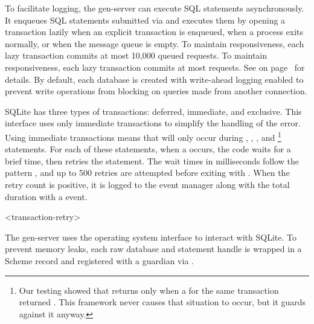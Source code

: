 To facilitate logging, the  gen-server can execute SQL statements
asynchronously. It enqueues SQL statements submitted via  and
executes them by opening a transaction lazily when an explicit transaction is
enqueued, when a  process exits normally, or when the 
message queue is empty.
To maintain responsiveness, each lazy transaction commits at most 10,000 queued  requests.
To maintain responsiveness, each lazy transaction commits at most   requests.
See  on page~\pageref{db:options} for details.
By default, each database is created with write-ahead logging enabled
to prevent write operations from blocking on queries made from another
connection.

SQLite has three types of transactions: deferred, immediate, and
exclusive. This interface uses only immediate transactions to simplify
the handling of the  error.  Using immediate
transactions means that  will only occur during
, , ,
and \footnote{Our testing showed that
   returns  only when a
   for the same transaction returned
  . This framework never causes that situation to
  occur, but it guards against it anyway.} statements. For each of
these statements, when a  occurs, the code waits
for a brief time, then retries the statement. The wait times in
milliseconds follow the pattern , and up to 500 retries are attempted before
exiting with .  When
the retry count is positive, it is logged to the event manager along
with the total duration with a  event.

\begin{pubevent}{<transaction-retry>}
\end{pubevent}

The  gen-server uses the operating system interface to
interact with SQLite. To prevent memory leaks, each raw database and
statement handle is wrapped in a Scheme record and registered with a
guardian via .

